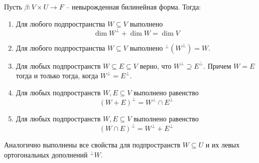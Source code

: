 \begin{claim}\label{claim::DualitySpaces}
Пусть $\beta\colon V\times U\to F$ -- невырожденная билинейная форма. Тогда:
\begin{enumerate}
\item Для любого подпространства $W\subseteq V$ выполнено
\[
\dim W^\bot + \dim W = \dim V
\]
\item Для любого подпространства $W\subseteq V$ выполнено ${}^\bot(W^\bot) = W$.
\item Для любых подпространств $W\subseteq E\subseteq V$ верно, что $W^\bot \supseteq E^\bot$. Причем $W = E$ тогда и только тогда, когда $W^\bot = E^\bot$.
\item Для любых подпространств $W, E\subseteq V$ выполнено равенство
\[
(W + E)^\bot = W^\bot \cap E^\bot
\]
\item Для любых подпространств $W, E\subseteq V$ выполнено равенство
\[
(W\cap E)^\bot = W^\bot + E^\bot
\]
\end{enumerate}
Аналогично выполнены все свойства для подпространств $W\subseteq U$ и их левых ортогональных дополнений ${}^\bot W$.
\end{claim}
